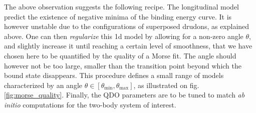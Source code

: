 \documentclass[reprint, amsmath, amssymb, floatfix, aps, pra]{revtex4-2}
\begin{document}
    The above observation suggests the following recipe. The longitudinal model predict the existence of negative minima of the binding energy curve. It is however unstable due to the configurations of superposed drudons, as explained above. One can then \textit{regularize} this 1d model by allowing for a non-zero angle $\theta$, and slightly increase it until reaching a certain level of smoothness, that we have chosen here to be quantified by the quality of a Morse fit. The angle should however not be too large, smaller than the transition point beyond which the bound state disappears. This procedure defines a small range of models characterized by an angle $\theta\in[\theta_\text{min}, \theta_\text{max}]$, as illustrated on fig. \ref{fig:morse_quality}. Finally, the QDO parameters are to be tuned to match \textit{ab initio} computations for the two-body system of interest.
\end{document}
